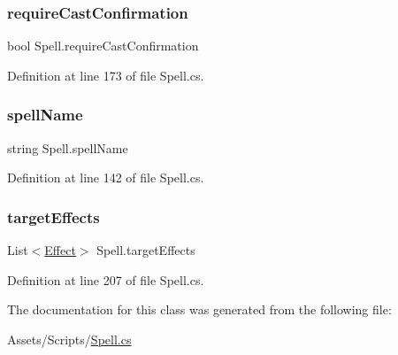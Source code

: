 \subsubsection{\texorpdfstring{requireCastConfirmation}{requireCastConfirmation}}
{\footnotesize\ttfamily bool Spell.\+require\+Cast\+Confirmation\hspace{0.3cm}{\ttfamily [get]}}



Definition at line 173 of file Spell.\+cs.

\mbox{\label{class_spell_a57762a8a1ff7a3b2c901fedc517035e9}} 
\subsubsection{\texorpdfstring{spellName}{spellName}}
{\footnotesize\ttfamily string Spell.\+spell\+Name\hspace{0.3cm}{\ttfamily [get]}}



Definition at line 142 of file Spell.\+cs.

\mbox{\label{class_spell_a473e9f79ee07b38f43ea942deb6d8c20}} 
\subsubsection{\texorpdfstring{targetEffects}{targetEffects}}
{\footnotesize\ttfamily List$<$\mbox{\hyperlink{class_effect}{Effect}}$>$ Spell.\+target\+Effects\hspace{0.3cm}{\ttfamily [get]}}



Definition at line 207 of file Spell.\+cs.



The documentation for this class was generated from the following file\+:\begin{DoxyCompactItemize}
\item 
Assets/\+Scripts/\mbox{\hyperlink{_spell_8cs}{Spell.\+cs}}\end{DoxyCompactItemize}
